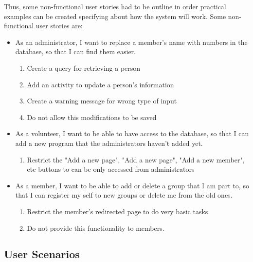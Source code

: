 \documentclass{l3proj}
\begin{document}
Thus, some non-functional user stories had to be outline in order practical examples can be created specifying about how the system will work. Some non-functional user stories are:

\begin{itemize}

\item  As an administrator, I want to replace a member's name with numbers in the database, so that I can find them easier.

	\begin{enumerate}
	
	\item Create a query for retrieving a person
	
	\item Add an activity to update a person's information
	
	\item Create a warning message for wrong type of input
	
	\item Do not allow this modifications to be saved
	\end{enumerate}
	
\item As a volunteer, I want to be able to have access to the database, so that I can add a new program that the administrators haven't added yet.

	\begin{enumerate}
	\item Restrict the "Add a new page", "Add a new page", "Add a new member", etc buttons to can be only accessed from administrators
	\end{enumerate}
	
\item As a member, I want to be able to add or delete a group that I am part to, so that I can register my self to new groups or delete me from the old ones.

	\begin{enumerate}
	\item Restrict the member's redirected page to do very basic tasks
	\item Do not provide this functionality to members.
	\end{enumerate}

\end{itemize}

\subsection{User Scenarios}
\label{user_scenarios}
\end{document}
